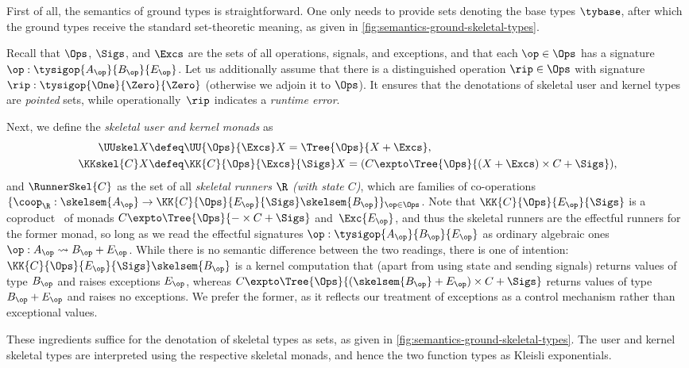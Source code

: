 First of all, the semantics of ground types is straightforward. One only needs to provide
sets denoting the base types $\tybase$, after which the ground types receive the standard
set-theoretic meaning, as given in \cref{fig:semantics-ground-skeletal-types}.

Recall that $\Ops$, $\Sigs$, and $\Excs$ are the sets of all operations, signals, 
and exceptions, and that each $\op \in \Ops$ has a signature
$\op : \tysigop{A_\op}{B_\op}{E_\op}$.
%
Let us additionally assume that there is a distinguished operation
$\rip \in \Ops$ with signature $\rip : \tysigop{\One}{\Zero}{\Zero}$ (otherwise
we adjoin it to $\Ops$). It ensures that the denotations of skeletal
user and kernel types are \emph{pointed} sets, while operationally~$\rip$ indicates
a \emph{runtime error}.

Next, we define the \emph{skeletal user and kernel monads} as
%
\begin{align*}
  \UUskel X &\defeq \UU{\Ops}{\Excs} X= \Tree{\Ops}{X + \Excs}, \\
  \KKskel{C} X &\defeq \KK{C}{\Ops}{\Excs}{\Sigs} X = (C \expto \Tree{\Ops}{(X + \Excs) \times C + \Sigs}),
\end{align*}
%
and $\RunnerSkel{C}$ as the set of all \emph{skeletal runners $\R$ (with state $C$)}, 
which are families of co-operations
%
$
  \{\coop_\R : \skelsem{A_\op} \to \KK{C}{\Ops}{E_\op}{\Sigs} \skelsem{B_\op} \}_{\op \in \Ops}
$.
%
%
Note that $\KK{C}{\Ops}{E_\op}{\Sigs}$ is a coproduct~\cite{Hyland:CombiningEffects} of monads
$C \expto \Tree{\Ops}{{-} \times C + \Sigs}$ and~$\Exc{E_\op}$, and thus the skeletal
runners are the effectful runners for the former monad, so long as we read the effectful
signatures $\op : \tysigop{A_\op}{B_\op}{E_\op}$ as ordinary algebraic ones $\op : A_\op \leadsto B_\op + E_\op$.
%
While there is no semantic difference between the two readings, there is one of intention:
$\KK{C}{\Ops}{E_\op}{\Sigs} \skelsem{B_\op}$ is a kernel computation that (apart from
using state and sending signals) returns values of type $B_\op$ and raises
exceptions $E_\op$, whereas $C \expto \Tree{\Ops}{(\skelsem{B_\op} + E_\op) \times C + \Sigs}$ returns values of type
$B_\op + E_\op$ and raises no exceptions. We prefer the former, as it reflects our treatment of exceptions as a
control mechanism rather than exceptional values.

These ingredients suffice for the denotation of skeletal types as sets, as given in
\cref{fig:semantics-ground-skeletal-types}. The user and kernel skeletal types
are interpreted using the respective skeletal monads, and hence the two function types as Kleisli 
exponentials.

